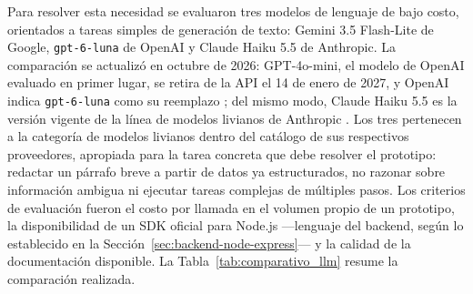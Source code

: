 Para resolver esta necesidad se evaluaron tres modelos de lenguaje de bajo costo, orientados a tareas simples de generación de texto: Gemini 3.5 Flash-Lite de Google, \texttt{gpt-6-luna} de OpenAI y Claude Haiku 5.5 de Anthropic. La comparación se actualizó en octubre de 2026: GPT-4o-mini, el modelo de OpenAI evaluado en primer lugar, se retira de la API el 14 de enero de 2027, y OpenAI indica \texttt{gpt-6-luna} como su reemplazo \parencite{OpenAIDeprecations2026}; del mismo modo, Claude Haiku 5.5 es la versión vigente de la línea de modelos livianos de Anthropic \parencite{AnthropicPricing2026}. Los tres pertenecen a la categoría de modelos livianos dentro del catálogo de sus respectivos proveedores, apropiada para la tarea concreta que debe resolver el prototipo: redactar un párrafo breve a partir de datos ya estructurados, no razonar sobre información ambigua ni ejecutar tareas complejas de múltiples pasos. Los criterios de evaluación fueron el costo por llamada en el volumen propio de un prototipo, la disponibilidad de un SDK oficial para Node.js ---lenguaje del backend, según lo establecido en la Sección~\ref{sec:backend-node-express}--- y la calidad de la documentación disponible. La Tabla~\ref{tab:comparativo_llm} resume la comparación realizada.

